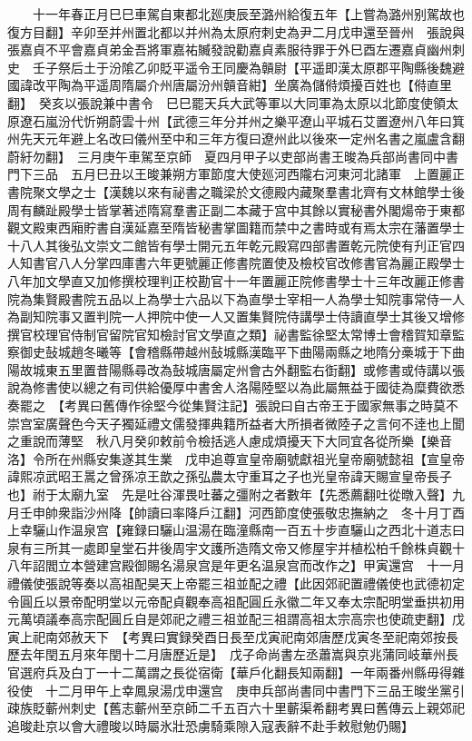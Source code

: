 　　十一年春正月巳巳車駕自東都北廵庚辰至潞州給復五年【上嘗為潞州别駕故也復方目翻】辛卯至并州置北都以并州為太原府刺史為尹二月戊申還至晉州　張說與張嘉貞不平會嘉貞弟金吾將軍嘉祐贓發說勸嘉貞素服待罪于外巳酉左遷嘉貞幽州刺史　壬子祭后土于汾隂乙卯貶平遥令王同慶為贑尉【平遥即漢太原郡平陶縣後魏避國諱改平陶為平遥周隋屬介州唐屬汾州贑音紺】坐廣為儲偫煩擾百姓也【偫直里翻】　癸亥以張說兼中書令　巳巳罷天兵大武等軍以大同軍為太原以北節度使領太原遼石嵐汾代忻朔蔚雲十州【武德三年分并州之樂平遼山平城石艾置遼州八年曰箕州先天元年避上名改曰儀州至中和三年方復曰遼州此以後來一定州名書之嵐盧含翻蔚紆勿翻】　三月庚午車駕至京師　夏四月甲子以吏部尚書王晙為兵部尚書同中書門下三品　五月巳丑以王晙兼朔方軍節度大使廵河西隴右河東河北諸軍　上置麗正書院聚文學之士【漢魏以來有祕書之職梁於文德殿内藏聚羣書北齊有文林館學士後周有麟趾殿學士皆掌著述隋寫羣書正副二本藏于宫中其餘以實秘書外閣煬帝于東都觀文殿東西廂貯書自漢延嘉至隋皆秘書掌圖籍而禁中之書時或有焉太宗在藩置學士十八人其後弘文崇文二館皆有學士開元五年乾元殿寫四部書置乾元院使有刋正官四人知書官八人分掌四庫書六年更號麗正修書院置使及檢校官改修書官為麗正殿學士八年加文學直又加修撰校理判正校勘官十一年置麗正院修書學士十三年改麗正修書院為集賢殿書院五品以上為學士六品以下為直學士宰相一人為學士知院事常侍一人為副知院事又置判院一人押院中使一人又置集賢院侍講學士侍讀直學士其後又增修撰官校理官侍制官留院官知檢討官文學直之類】祕書監徐堅太常博士會稽賀知章監察御史鼔城趙冬曦等【會稽縣帶越州鼔城縣漢臨平下曲陽兩縣之地隋分槀城于下曲陽故城東五里置昔陽縣尋改為鼔城唐屬定州會古外翻監右衘翻】或修書或侍講以張說為修書使以總之有司供給優厚中書舍人洛陽陸堅以為此屬無益于國徒為糜費欲悉奏罷之　【考異曰舊傳作徐堅今從集賢注記】張說曰自古帝王于國家無事之時莫不崇宫室廣聲色今天子獨延禮文儒發揮典籍所益者大所損者微陸子之言何不逹也上聞之重說而薄堅　秋八月癸卯敕前令檢括逃人慮成煩擾天下大同宜各從所樂【樂音洛】令所在州縣安集遂其生業　戊申追尊宣皇帝廟號獻祖光皇帝廟號懿祖【宣皇帝諱熙凉武昭王暠之曾孫凉王歆之孫弘農太守重耳之子也光皇帝諱天賜宣皇帝長子也】祔于太廟九室　先是吐谷渾畏吐蕃之彊附之者數年【先悉薦翻吐從暾入聲】九月壬申帥衆詣沙州降【帥讀曰率降戶江翻】河西節度使張敬忠撫納之　冬十月丁酉上幸驪山作温泉宫【雍録曰驪山温湯在臨潼縣南一百五十步直驪山之西北十道志曰泉有三所其一處即皇堂石井後周宇文護所造隋文帝又修屋宇并植松柏千餘株貞觀十八年詔閻立本營建宫殿御賜名湯泉宫是年更名温泉宫而改作之】甲寅還宫　十一月禮儀使張說等奏以高祖配昊天上帝罷三祖並配之禮【此因郊祀置禮儀使也武德初定令圓丘以景帝配明堂以元帝配貞觀奉高祖配圓丘永徽二年又奉太宗配明堂垂拱初用元萬頃議奉高宗配圓丘自是郊祀之禮三祖並配三祖謂高祖太宗高宗也使疏吏翻】戊寅上祀南郊赦天下　【考異曰實録癸酉日長至戊寅祀南郊唐歷戊寅冬至祀南郊按長歷去年閏五月來年閏十二月唐歷近是】　戊子命尚書左丞蕭嵩與京兆蒲同岐華州長官選府兵及白丁一十二萬謂之長從宿衛【華戶化翻長知兩翻】一年兩番州縣毋得雜役使　十二月甲午上幸鳳泉湯戊申還宫　庚申兵部尚書同中書門下三品王晙坐黨引疎族貶蘄州刺史【舊志蘄州至京師二千五百六十里蘄渠希翻考異曰舊傳云上親郊祀追晙赴京以會大禮晙以時屬氷壯恐虜騎乘隙入寇表辭不赴手敕慰勉仍賜】

